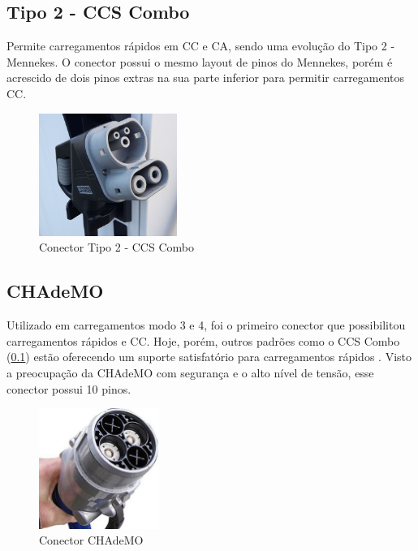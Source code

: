       \subsection{Tipo 2 - CCS Combo}
      \label{stateofart:plugs:combo}

        Permite carregamentos rápidos em \ac{CC} e \ac{CA}, sendo uma evolução do Tipo 2 - Mennekes. O conector possui o mesmo layout de pinos do Mennekes, porém é acrescido de dois pinos extras na sua parte inferior para permitir carregamentos \ac{CC}.

        \begin{figure}[H]
          \begin{center}
            \includegraphics[width=0.40\textwidth,natwidth=1024,natheight=973]{assets/images/connectors-combo.jpg}
            \caption{Conector Tipo 2 - CCS Combo}
            \label{fig:combo}
          \end{center}
        \end{figure}

      \subsection{CHAdeMO}
      \label{stateofart:plugs:chademo}

        Utilizado em carregamentos modo 3 e 4, foi o primeiro conector que possibilitou carregamentos rápidos e \ac{CC}. Hoje, porém, outros padrões como o CCS Combo (\ref{stateofart:plugs:combo}) estão oferecendo um suporte satisfatório para carregamentos rápidos \cite{ieee-review-evse}. Visto a preocupação da CHAdeMO com segurança e o alto nível de tensão, esse conector possui 10 pinos.

        \begin{figure}[H]
          \begin{center}
            \includegraphics[width=0.35\textwidth,natwidth=300,natheight=300]{assets/images/connectors-chademo.jpg}
            \caption{Conector CHAdeMO}
            \label{fig:chademo}
          \end{center}
        \end{figure}

